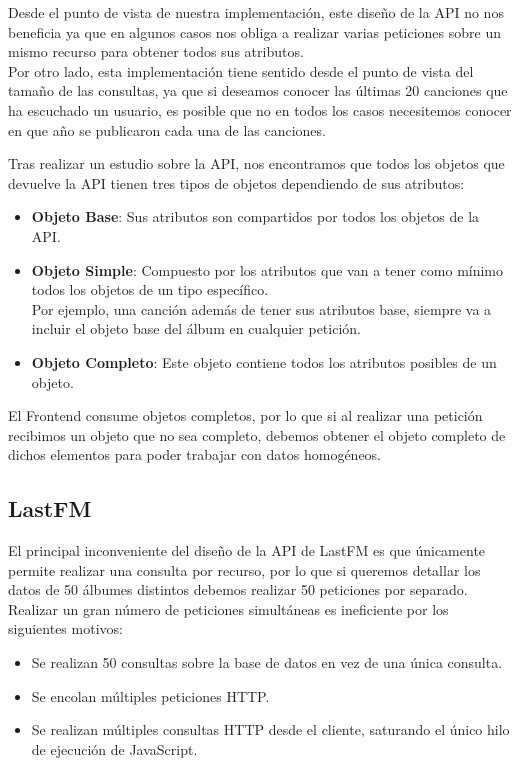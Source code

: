 Desde el punto de vista de nuestra implementación, este diseño de la API
no nos beneficia ya que en algunos casos nos obliga a realizar varias
peticiones sobre un mismo recurso para obtener todos sus atributos.\\
Por otro lado, esta implementación tiene sentido desde el punto de vista
del tamaño de las consultas, ya que si deseamos conocer las últimas 20
canciones que ha escuchado un usuario, es posible que no en todos los
casos necesitemos conocer en que año se publicaron cada una de las
canciones.

Tras realizar un estudio sobre la API, nos encontramos que todos los
objetos que devuelve la API tienen tres tipos de objetos dependiendo de
sus atributos:

\begin{itemize}
\itemsep0em 
\item
  \textbf{Objeto Base}: Sus atributos son compartidos por todos los objetos de la
  API.
\item
  \textbf{Objeto Simple}: Compuesto por los atributos que van a tener como mínimo
  todos los objetos de un tipo específico.\\
  Por ejemplo, una canción además de tener sus atributos base, siempre
  va a incluir el objeto base del álbum en cualquier petición.
\item
  \textbf{Objeto Completo}: Este objeto contiene todos los atributos posibles de
  un objeto.
\end{itemize}

El Frontend consume objetos completos, por lo que si al realizar una
petición recibimos un objeto que no sea completo, debemos obtener el
objeto completo de dichos elementos para poder trabajar con datos
homogéneos.

\hypertarget{lastfm}{%
\subsection{LastFM}\label{lastfm}}

El principal inconveniente del diseño de la API de LastFM\cite{last.fm_2022} es que
únicamente permite realizar una consulta por recurso, por lo que si
queremos detallar los datos de 50 álbumes distintos debemos realizar 50
peticiones por separado.\\
Realizar un gran número de peticiones simultáneas es ineficiente por los siguientes motivos:

\begin{itemize}
\itemsep0em
\item
  Se realizan 50 consultas sobre la base de datos en vez de una única
  consulta.
\item
  Se encolan múltiples peticiones HTTP.
\item
  Se realizan múltiples consultas HTTP desde el cliente, saturando el
  único hilo de ejecución de JavaScript.
\end{itemize}

